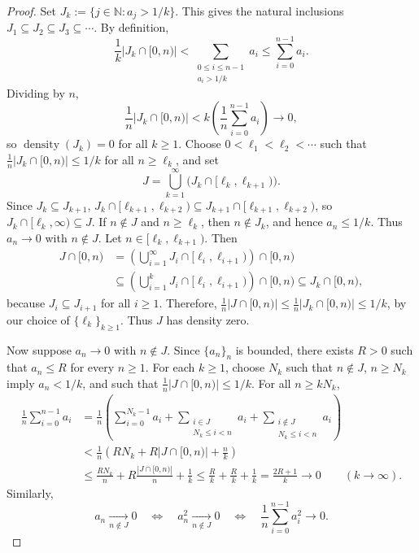 \documentclass[11pt,a4paper]{article}
\begin{document}
\begin{proof}
Set $J_k:=\{j\in\mathbb N:a_j>1/k\}$. This gives the natural inclusions
$J_1\subseteq J_2\subseteq J_3\subseteq\cdots$.
By definition,
\[
 \frac1k|J_k\cap[0,n)|
 <\sum_{\substack{0\leq i\leq n-1\\a_i>1/k}}a_i
 \leq\sum_{i=0}^{n-1}a_i.
\]
Dividing by $n$,
\[
 \frac1n|J_k\cap[0,n)|
 <k\left(\frac1n\sum_{i=0}^{n-1}a_i\right)\longrightarrow0,
\]
so $\operatorname{density}(J_k)=0$ for all $k\geq1$.
Choose $0<\ell_1<\ell_2<\cdots$ such that
$\frac1n|J_k\cap[0,n)|\leq1/k$ for all $n\geq\ell_k$, and set
\[
 J=\bigcup_{k=1}^\infty\bigl(J_k\cap[\ell_k,\ell_{k+1})\bigr).
\]
Since $J_k\subseteq J_{k+1}$,
$J_k\cap[\ell_{k+1},\ell_{k+2})\subseteq
 J_{k+1}\cap[\ell_{k+1},\ell_{k+2})$, so
$J_k\cap[\ell_k,\infty)\subseteq J$.
If $n\notin J$ and $n\geq\ell_k$, then $n\notin J_k$, and hence
$a_n\leq1/k$. Thus $a_n\to0$ with $n\notin J$.
Let $n\in[\ell_k,\ell_{k+1})$. Then
\[
 \begin{aligned}
 J\cap[0,n)
 &=\left(\bigcup_{i=1}^\infty J_i\cap[\ell_i,\ell_{i+1})\right)\cap[0,n)\\
 &\subseteq\left(\bigcup_{i=1}^{k}J_i\cap[\ell_i,\ell_{i+1})\right)\cap[0,n)
 \subseteq J_k\cap[0,n),
 \end{aligned}
\]
because $J_i\subseteq J_{i+1}$ for all $i\geq1$.
Therefore, $\frac1n|J\cap[0,n)|\leq\frac1n|J_k\cap[0,n)|\leq1/k$,
by our choice of $\{\ell_k\}_{k\geq1}$. Thus $J$ has density zero.

Now suppose $a_n\to0$ with $n\notin J$. Since $\{a_n\}_n$ is bounded,
there exists $R>0$ such that $a_n\leq R$ for every $n\geq1$.
For each $k\geq1$, choose $N_k$ such that $n\notin J$, $n\geq N_k$
imply $a_n<1/k$, and such that $\frac1n|J\cap[0,n)|\leq1/k$.
For all $n\geq kN_k$,
\[
 \begin{aligned}
 \frac1n\sum_{i=0}^{n-1}a_i
 &=\frac1n\left(\sum_{i=0}^{N_k-1}a_i
   +\sum_{\substack{i\in J\\N_k\leq i<n}}a_i
   +\sum_{\substack{i\notin J\\N_k\leq i<n}}a_i\right)\\
 &<\frac1n\left(RN_k+R|J\cap[0,n)|+\frac nk\right)\\
 &\leq\frac{RN_k}{n}+R\frac{|J\cap[0,n)|}{n}+\frac1k
 \leq\frac Rk+\frac Rk+\frac1k
 =\frac{2R+1}{k}\longrightarrow0\qquad(k\to\infty).
 \end{aligned}
\]
Similarly,
\[
 a_n\xrightarrow[n\notin J]{}0
 \quad\Longleftrightarrow\quad a_n^2\xrightarrow[n\notin J]{}0
 \quad\Longleftrightarrow\quad\frac1n\sum_{i=0}^{n-1}a_i^2\longrightarrow0.
\]
\end{proof}
\end{document}
